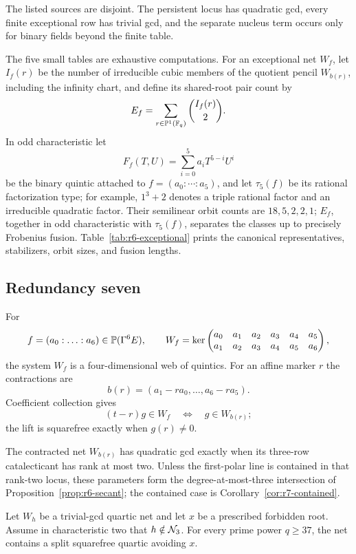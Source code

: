 The listed sources are disjoint.  The persistent locus has quadratic
gcd, every finite exceptional row has trivial gcd, and the separate
nucleus term occurs only for binary fields beyond the finite table.

The five small tables are exhaustive computations.  For an exceptional
net \(W_f\), let \(I_f(r)\) be the number of irreducible cubic members
of the quotient pencil \(W_{b(r)}\), including the infinity chart, and
define its shared-root pair count by
\[
                 E_f=\sum_{r\in\mathbb P^1(\mathbb F_q)}\binom{I_f(r)}2.
\]
In odd characteristic let
\[
                 F_f(T,U)=\sum_{i=0}^5a_iT^{5-i}U^i
\]
be the binary quintic attached to \(f=(a_0:\cdots:a_5)\), and let
\(\tau_5(f)\) be its rational factorization type; for example,
\(1^3+2\) denotes a triple rational factor and an irreducible
quadratic factor.  Their semilinear orbit counts are
\(18,5,2,2,1\); \(E_f\), together in odd characteristic with
\(\tau_5(f)\), separates the classes up to precisely Frobenius fusion.
Table~\ref{tab:r6-exceptional} prints
the canonical representatives, stabilizers, orbit sizes, and fusion
lengths.



\subsection{Redundancy seven}

For
\[
f=(a_0:\ldots:a_6)\in\mathbb P(\Gamma^6E),\qquad
W_f=\ker
\begin{pmatrix}
a_0&a_1&a_2&a_3&a_4&a_5\\
a_1&a_2&a_3&a_4&a_5&a_6
\end{pmatrix},
\]
the system $W_f$ is a four-dimensional web of quintics.  For an affine
marker $r$ the contractions are
\[
 b(r)=(a_1-ra_0,\ldots,a_6-ra_5).
\]
Coefficient collection gives
\[
(t-r)g\in W_f\quad\Longleftrightarrow\quad g\in W_{b(r)};
\]
the lift is squarefree exactly when $g(r)\ne0$.

The contracted net \(W_{b(r)}\) has quadratic gcd exactly when its
three-row catalecticant has rank at most two.  Unless the first-polar
line is contained in that rank-two locus, these parameters form the
degree-at-most-three intersection of
Proposition~\ref{prop:r6-secant}; the contained case is
Corollary~\ref{cor:r7-contained}.

\begin{proposition}
\label{prop:r7-pointed}%
%
%
Let \(W_h\) be a trivial-gcd quartic net and let \(x\) be a prescribed
forbidden root.  Assume in characteristic two that \(h\notin\mathcal N_3\).
For every prime power \(q\geq37\), the net contains a split squarefree
quartic avoiding \(x\).
\end{proposition}


